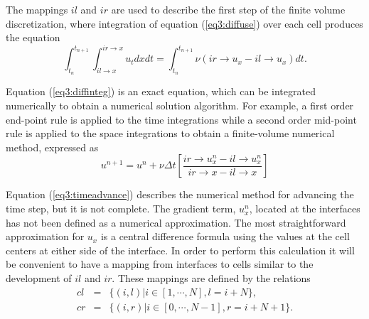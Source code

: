 \documentclass[10pt,epsf]{book}
\begin{document}
The mappings $il$ and $ir$ are used to describe the first
step of the finite volume discretization, where integration of
equation (\ref{eq3:diffuse}) over each cell produces the equation
\begin{equation}
\int_{t_n}^{t_{n+1}} \int_{il \rightarrow x}^{ir \rightarrow x} u_t dx
dt = \int_{t_n}^{t_{n+1}} \nu(ir \rightarrow u_x - il \rightarrow
u_x) dt.
\label{eq3:diffinteg}
\end{equation}

Equation (\ref{eq3:diffinteg}) is an exact equation, which can be
integrated numerically to obtain a numerical solution algorithm.
For example, a first order end-point rule is applied to the time
integrations while a second order mid-point rule is applied to the space
integrations to obtain a finite-volume numerical method, expressed as
\begin{equation}
u^{n+1} = u^n + \nu \Delta t
\left[ \frac{ir \rightarrow u^n_x - il \rightarrow u^n_x}
          {ir\rightarrow x - il\rightarrow x}\right]
\label{eq3:timeadvance}
\end{equation}

Equation (\ref{eq3:timeadvance}) describes the numerical method for
advancing the time step, but it is not complete.  The gradient term,
$u^n_x$, located at the interfaces has not been defined as a numerical
approximation.  The most straightforward approximation for $u_x$ is a
central difference formula using the values at the cell centers at
either side of the interface.  In order to perform this calculation it
will be convenient to have a mapping from interfaces to cells similar to
the development of $il$ and $ir$.  These mappings are defined by
the relations
\begin{equation}
\begin{array}{rcl}
cl & = & \lbrace (i,l) | i \in [1, \cdots, N], l = i+N \rbrace,\\
cr & = & \lbrace (i,r) | i \in [0, \cdots, N-1], r = i+N+1 \rbrace.\\
\end{array}
\label{eq3:facemaps}
\end{equation}
\end{document}
